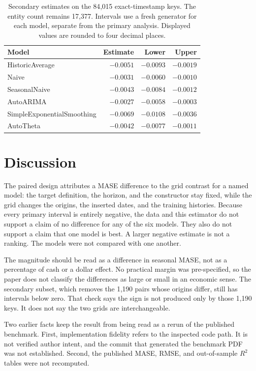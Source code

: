 \documentclass[11pt]{article}
\begin{document}
\begin{table}[ht]
\centering
\caption{Secondary estimates on the 84{,}015 exact-timestamp keys. The entity count remains 17{,}377. Intervals use a fresh generator for each model, separate from the primary analysis. Displayed values are rounded to four decimal places.}
\label{tab:secondary}
\begin{tabular}{lrrr}
\toprule
Model & Estimate & Lower & Upper \\
\midrule
HistoricAverage & $-0.0051$ & $-0.0093$ & $-0.0019$ \\
Naive & $-0.0031$ & $-0.0060$ & $-0.0010$ \\
SeasonalNaive & $-0.0043$ & $-0.0084$ & $-0.0012$ \\
AutoARIMA & $-0.0027$ & $-0.0058$ & $-0.0003$ \\
SimpleExponentialSmoothing & $-0.0069$ & $-0.0108$ & $-0.0036$ \\
AutoTheta & $-0.0042$ & $-0.0077$ & $-0.0011$ \\
\bottomrule
\end{tabular}
\end{table}

\section{Discussion}
\label{sec:discussion}

The paired design attributes a MASE difference to the grid contrast for a named model: the target definition, the horizon, and the constructor stay fixed, while the grid changes the origins, the inserted dates, and the training histories. Because every primary interval is entirely negative, the data and this estimator do not support a claim of no difference for any of the six models. They also do not support a claim that one model is best. A larger negative estimate is not a ranking. The models were not compared with one another.

The magnitude should be read as a difference in seasonal MASE, not as a percentage of cash or a dollar effect. No practical margin was pre-specified, so the paper does not classify the differences as large or small in an economic sense. The secondary subset, which removes the 1{,}190 pairs whose origins differ, still has intervals below zero. That check says the sign is not produced only by those 1{,}190 keys. It does not say the two grids are interchangeable.

Two earlier facts keep the result from being read as a rerun of the published benchmark. First, implementation fidelity refers to the inspected code path. It is not verified author intent, and the commit that generated the benchmark PDF was not established. Second, the published MASE, RMSE, and out-of-sample \(R^{2}\) tables were not recomputed.
\end{document}
